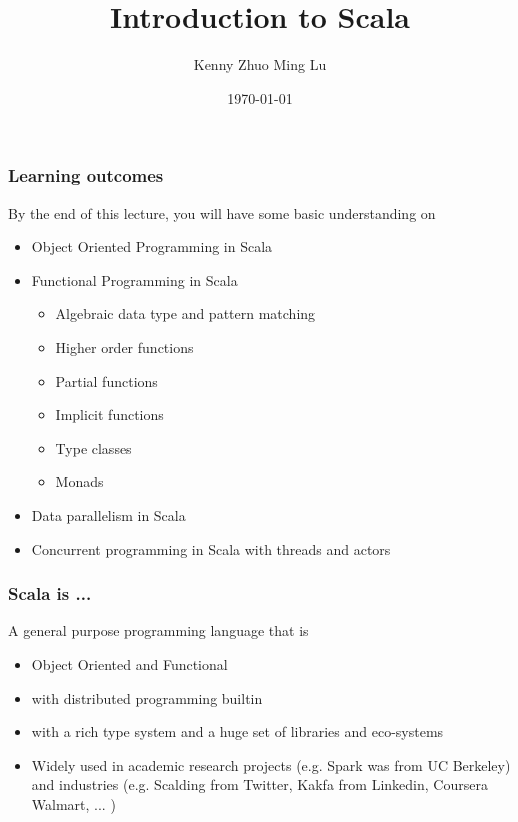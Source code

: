 \documentclass{beamer}
\begin{document}
\title{Introduction to Scala} 
\author{
 Kenny Zhuo Ming Lu
}
\date{\today} 


\frame{\titlepage} 

%

\begin{frame}[fragile]
\frametitle{Learning outcomes}
By the end of this lecture, you will have some basic understanding on
\begin{itemize}
 \item Object Oriented Programming in Scala
 \item Functional Programming in Scala
 \begin{itemize}
 \item Algebraic data type and pattern matching
 \item Higher order functions
 \item Partial functions
 \item Implicit functions
 \item Type classes
 \item Monads
\end{itemize}
 \item Data parallelism in Scala
 \item Concurrent programming in Scala with threads and actors
\end{itemize}
\end{frame}


\begin{frame}[fragile]
\frametitle{Scala is ... }

A general purpose programming language that is 
\begin{itemize}
 \item Object Oriented and Functional
 \item with distributed programming builtin
 \item with a rich type system and a huge set of libraries and eco-systems
 \item Widely used in academic research projects (e.g. Spark was from
   UC Berkeley) and industries   (e.g. Scalding from Twitter, Kakfa from Linkedin, Coursera Walmart, ... )
\end{itemize}
\end{frame}
\end{document}
